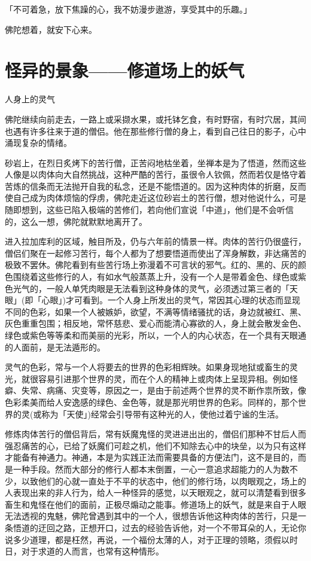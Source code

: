 \documentclass[12pt,twoside,openany]{book}
\begin{document}
「不可着急，放下焦躁的心，我不妨漫步遨游，享受其中的乐趣。」

佛陀想着，就安下心来。

\section{怪异的景象——修道场上的妖气}\label{sec2.3}

人身上的灵气

佛陀继续向前走去，一路上或采撷水果，或托钵乞食，有时野宿，有时穴居，其间也遇有许多往来于道的僧侣。他在那些修行僧的身上，看到自己往日的影子，心中涌现复杂的情绪。

砂岩上，在烈日炙烤下的苦行僧，正苦闷地枯坐着，坐禅本是为了悟道，然而这些人像是以肉体向大自然挑战，这种严酷的苦行，虽很令人钦佩，然而若仅是恪守着苦炼的信条而无法抛开自我的私念，还是不能悟道的。因为这种肉体的折磨，反而使自己成为肉体烦恼的俘虏，佛陀走近这位砂岩土的苦行僧，想对他说什么，可是随即想到，这些已陷入极端的苦修们，若向他们宣说「中道」，他们是不会听信的，这么一想，佛陀就默默地离开了。

进入拉加库利的区域，触目所及，仍与六年前的情景一样。肉体的苦行仍很盛行，僧侣们聚在一起修习苦行，每个人都为了想要悟道而使出了浑身解数，非达痛苦的极致不罢休。佛陀看到有些苦行场上弥漫着不可言状的邪气。红的、黑的、灰的颜色围绕着这些修行的人，有如水气般蒸蒸上升，没有一个人是带着金色、绿色或紫色光气的，一般人单凭肉眼是无法看到这种身体的灵气，必须透过第三者的「天眼」(即「心眼」)才可看到。一个人身上所发出的灵气，常因其心理的状态而显现不同的色彩，如果一个人被嫉妒，欲望，不满等情绪骚扰的话，身边就被红、黑、灰色重重包围；相反地，常怀慈悲、爱心而能清心寡欲的人，身上就会散发金色、绿色或紫色等等柔和而美丽的光彩，所以，一个人的内心状态，在一个具有天眼通的人面前，是无法遁形的。

灵气的色彩，常与一个人将要去的世界的色彩相辉映。如果身现地狱或畜生的灵光，就很容易引进那个世界的灵，而在个人的精神上或肉体上呈现异相。例如怪癖、失常、病痛、灾变等，原因之一，是由于前述两个世界的灵不断作祟所致，像色彩柔美而给人安逸感的绿色、金色等，就是那光明世界的色彩。同样的，那个世界的灵(或称为「天使」)经常会引导带有这种光的人，使他过着宁谧的生活。

修炼肉体苦行的僧侣背后，常有妖魔鬼怪的灵进进出出的，僧侣们那种不甘后人而强忍痛苦的心，已给了妖魔们可趁之机，他们不知除去心中的块垒，以为只有这样才能备有神通力。神通，本是为实践正法而需要具备的方便法门，这不是目的，而是一种手段。然而大部分的修行人都本末倒置，一心一意追求超能力的人为数不少，以致他们的心就一直处于不平的状态中，他们的修行场，以肉眼观之，场上的人表现出来的非人行为，给人一种怪异的感觉，以天眼观之，就可以清楚看到很多畜生和鬼怪在他们的面前，正极尽煽动之能事。修道场上的妖气，就是来自于人眼无法透视的鬼魅，佛陀曾遇到其中的一个人，很想告诉他这种肉体的苦行，只是一条悟道的迂回之路，正想开口，过去的经验告诉他，对一个不带耳朵的人，无论你说多少道理，都是枉然，再说，一个福份太薄的人，对于正理的领略，须假以时日，对于求道的人而言，也常有这种情形。
\end{document}
